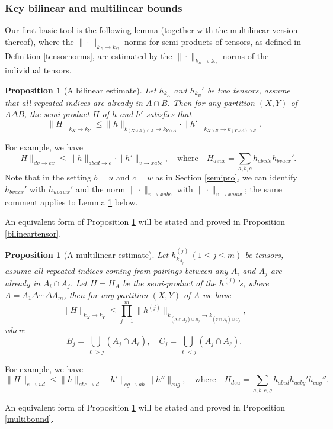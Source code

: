 \documentclass[11 pt,reqno]{amsart}
\newtheorem{prop}[thm]{Proposition}
\theoremstyle{definition}
\theoremstyle{remark}
\numberwithin{equation}{section}
\begin{document}
\subsubsection{Key bilinear and multilinear bounds} Our first basic tool is the following lemma (together with the multilinear version thereof), where the $\|\cdot\|_{k_B\to k_C}$ norms for semi-products of tensors, as defined in Definition \ref{tensornorms}, are estimated by the $\|\cdot\|_{k_B\to k_C}$ norms of the individual tensors.
\begin{prop}[A bilinear estimate]\label{bilineartensor0} Let $h_{k_A}$ and $h_{k_B}'$ be two tensors, assume that all repeated indices are already in $A\cap B$. Then for any partition $(X,Y)$ of $A\Delta B$, the semi-product $H$ of $h$ and $h'$ satisfies that
\[\|H\|_{k_X\to k_Y}\leq \|h\|_{k_{(X\cup B)\cap A}\to k_{Y\cap A}}\cdot\|h'\|_{k_{X\cap B}\to k_{(Y\cup A)\cap B}}.\]
\end{prop} For example, we have
\[\|H\|_{dv\to ex}\leq\|h\|_{abcd\to e}\cdot\|h'\|_{v\to xabc},\quad\mathrm{where}\quad H_{devx}=\sum_{a,b,c}h_{abcde}h_{bvacx}'.\] Note that in the setting $b=u$ and $c=w$ as in Section \ref{semipro}, we can identify $h_{bvacx}'$ with $h_{uvawx}'$ and the norm $\|\cdot\|_{v\to xabc}$ with $\|\cdot\|_{v\to xauw}$; the same comment applies to Lemma \ref{multibound0} below.

An equivalent form of Proposition \ref{bilineartensor0} will be stated and proved in Proposition \ref{bilineartensor}.
\begin{prop}[A multilinear estimate]\label{multibound0} Let $h_{k_{A_j}}^{(j)}\,(1\leq j\leq m)$ be tensors, assume all repeated indices coming from pairings between any $A_i$ and $A_j$ are already in $A_i\cap A_j$. Let $H=H_{A}$ be the semi-product of the $h^{(j)}$'s, where $A=A_1\Delta\cdots\Delta A_m$, then for any partition $(X,Y)$ of $A$ we have
\begin{equation}\label{multibound00}\|H\|_{k_X\to k_Y}\leq\prod_{j=1}^m\|h^{(j)}\|_{k_{(X\cap A_j)\cup B_j}\to k_{(Y\cap A_j)\cup C_j}},\end{equation} where
\[B_j=\bigcup_{\ell>j}(A_j\cap A_\ell),\quad C_j=\bigcup_{\ell <j}(A_j\cap A_\ell).\]
\end{prop} 
For example, we have
\[\|H\|_{e\to ud}\leq\|h\|_{abc\to d}\|h'\|_{eg\to ab}\|h''\|_{cug},\quad\mathrm{where}\quad H_{deu}=\sum_{a,b,c,g}h_{abcd}h_{aebg}'h_{cug}''.\]

An equivalent form of Proposition \ref{multibound0} will be stated and proved in Proposition \ref{multibound}.
\end{document}
